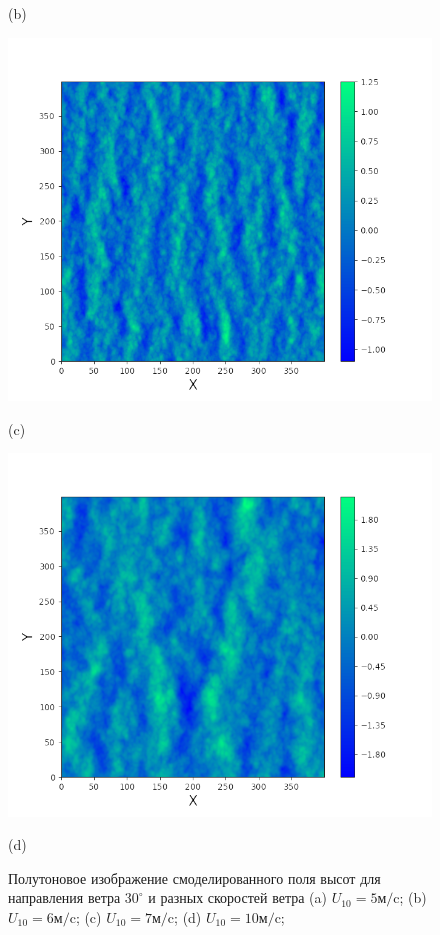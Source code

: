 \begin{figure}[h!]
\begin{minipage}{0.49\linewidth}
        (b)
    \end{minipage}
    \begin{minipage}{0.49\linewidth}
        \centering
        \includegraphics[width=\linewidth]{img/water7}

        (c)
    \end{minipage}
    \begin{minipage}{0.49\linewidth}
        \centering
        \includegraphics[width=\linewidth]{img/water10}

        (d)
    \end{minipage}
    \caption{ Полутоновое изображение смоделированного поля высот для
        направления ветра $30^\circ$ и разных скоростей ветра
        (a) $U_{10} = 5 \text{м}/\text{c}$;
        (b) $U_{10} = 6 \text{м}/\text{c}$;
        (c) $U_{10} = 7 \text{м}/\text{c}$;
        (d) $U_{10} = 10 \text{м}/\text{c}$;
}
    \label{fig:water}
\end{figure}

